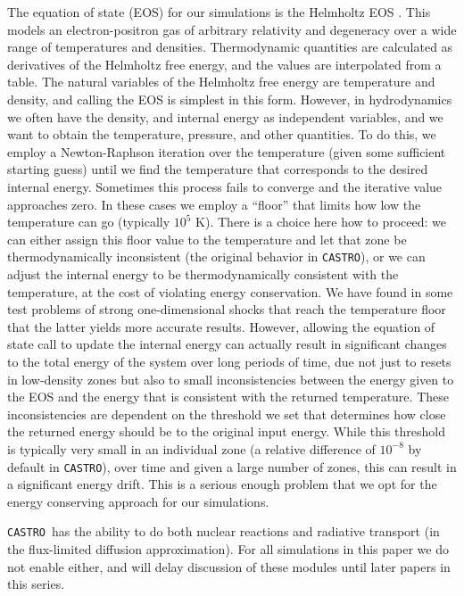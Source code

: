 \documentclass[iop]{../emulateapj}
\newcommand{\castro}{\texttt{CASTRO}}
\begin{document}
The equation of state (EOS) for our simulations is the Helmholtz EOS
\citep{timmes_swesty:2000}. This models an electron-positron gas of
arbitrary relativity and degeneracy over a wide range of temperatures
and densities. Thermodynamic quantities are calculated as derivatives
of the Helmholtz free energy, and the values are interpolated from a
table. The natural variables of the Helmholtz free energy are
temperature and density, and calling the EOS is simplest in this
form. However, in hydrodynamics we often have the density, and
internal energy as independent variables, and we want to obtain the
temperature, pressure, and other quantities. To do this, we employ a
Newton-Raphson iteration over the temperature (given some sufficient
starting guess) until we find the temperature that corresponds to the
desired internal energy. Sometimes this process fails to converge and
the iterative value approaches zero. In these cases we employ a
``floor'' that limits how low the temperature can go (typically 
$10^5$ K). There is a choice here how to proceed: we can either
assign this floor value to the temperature and let that zone be
thermodynamically inconsistent (the original behavior in \castro), or
we can adjust the internal energy to be thermodynamically consistent
with the temperature, at the cost of violating energy conservation. We
have found in some test problems of strong one-dimensional shocks that reach 
the temperature floor that the latter yields more accurate results. 
However, allowing the equation of state call to update the 
internal energy can actually result in significant changes to the 
total energy of the system over long periods of time, 
due not just to resets in low-density zones but also to small 
inconsistencies between the energy given to the EOS and the energy 
that is consistent with the returned temperature. These inconsistencies
are dependent on the threshold we set that determines how close the 
returned energy should be to the original input energy. While this 
threshold is typically very small in an individual zone (a relative 
difference of $10^{-8}$ by default in \castro), over time and given 
a large number of zones, this can result in a significant energy 
drift. This is a serious enough problem that we opt for the energy 
conserving approach for our simulations.

\castro\ has the ability to do both nuclear reactions and radiative 
transport (in the flux-limited diffusion approximation). For all simulations 
in this paper we do not enable either, and will delay discussion of 
these modules until later papers in this series.
\end{document}
